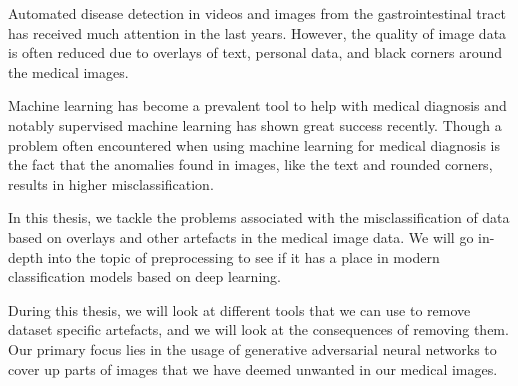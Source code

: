 Automated disease detection in videos and images from the gastrointestinal tract has received much attention in the last years.
However, the quality of image data is often reduced due to overlays of text, personal data, and black corners around the medical images.

Machine learning has become a prevalent tool to help with medical diagnosis and notably supervised machine learning has shown great success recently.
Though a problem often encountered when using machine learning for medical diagnosis is the fact that the anomalies found in images, like the text and rounded corners, results in higher misclassification.


In this thesis, we tackle the problems associated with the misclassification of data based on overlays and other artefacts in the medical image data.
We will go in-depth into the topic of preprocessing to see if it has a place in modern classification models based on deep learning. 

During this thesis, we will look at different tools that we can use to remove dataset specific artefacts, and we will look at the consequences of removing them.
Our primary focus lies in the usage of generative adversarial neural networks to cover up parts of images that we have deemed unwanted in our medical images.